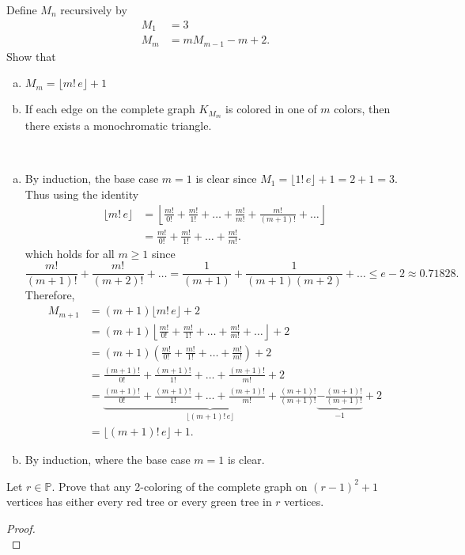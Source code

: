 \documentclass{article}
\newenvironment{problem}[2][Problem]{\begin{trivlist}
\item[\hskip \labelsep {\bfseries #1}\hskip \labelsep {\bfseries #2.}]}{\end{trivlist}}
\newenvironment{solution}[1][Solution.]{\begin{trivlist}
\item[\hskip \labelsep {\bfseries #1}]}{\end{trivlist}}
\begin{document}
\begin{problem}{2}
  Define $M_n$ recursively by \begin{align*}
    M_1 &= 3 \\
    M_m &= mM_{m-1} - m + 2.
  \end{align*} Show that \begin{enumerate}[(a)]
    \item $M_m = \lfloor m!\,e \rfloor + 1$
    \item If each edge on the complete graph $K_{M_m}$ is colored in one of $m$
    colors, then there exists a monochromatic triangle.
  \end{enumerate}
\end{problem}

\begin{solution} ~
  \begin{enumerate}[(a)]
    \item By induction, the base case $m=1$ is clear since
    $M_1 = \lfloor 1!\,e\rfloor + 1 = 2 + 1 = 3$.
    Thus using the identity \begin{align*}
      \lfloor m!\,e \rfloor &= \left\lfloor \frac{m!}{0!} + \frac{m!}{1!} + \hdots + \frac{m!}{m!} + \frac{m!}{(m+1)!} + \hdots \right\rfloor \\
      &= \frac{m!}{0!} + \frac{m!}{1!} + \hdots + \frac{m!}{m!}.
    \end{align*} which holds for all $m \geq 1$ since \[
      \frac{m!}{(m+1)!} + \frac{m!}{(m+2)!} + \hdots = \frac{1}{(m+1)} + \frac{1}{(m+1)(m+2)} + \hdots
      \leq e - 2 \approx 0.71828.
    \]
    Therefore,
    \begin{align*}
      M_{m+1} &= (m+1)\lfloor m!\,e \rfloor + 2 \\
              &= (m+1)\left\lfloor \frac{m!}{0!} + \frac{m!}{1!} + \hdots + \frac{m!}{m!} + \hdots  \right\rfloor + 2 \\
              &= (m+1)\left( \frac{m!}{0!} + \frac{m!}{1!} + \hdots + \frac{m!}{m!} \right) + 2 \\
              &= \frac{(m+1)!}{0!} + \frac{(m+1)!}{1!} + \hdots + \frac{(m+1)!}{m!} + 2 \\
              &= \underbrace{
                \frac{(m+1)!}{0!}
                + \frac{(m+1)!}{1!} + \hdots
                + \frac{(m+1)!}{m!}
                + \frac{(m+1)!}{(m+1)!}
              }_{\lfloor (m+1)!\, e \rfloor}
              \underbrace{- \frac{(m+1)!}{(m+1)!}}_{-1} + 2 \\
              &= \lfloor (m+1)!\, e \rfloor + 1.
    \end{align*}
    \item By induction, where the base case $m=1$ is clear.

  \end{enumerate}
\end{solution}
\pagebreak
\begin{problem}{3}
  Let $r \in \mathbb P$. Prove that any 2-coloring of the complete graph on
  $(r-1)^2 + 1$ vertices has either every red tree or every green tree in $r$
  vertices.
\end{problem}

\begin{proof} \text{} \\
\end{proof}
\end{document}
